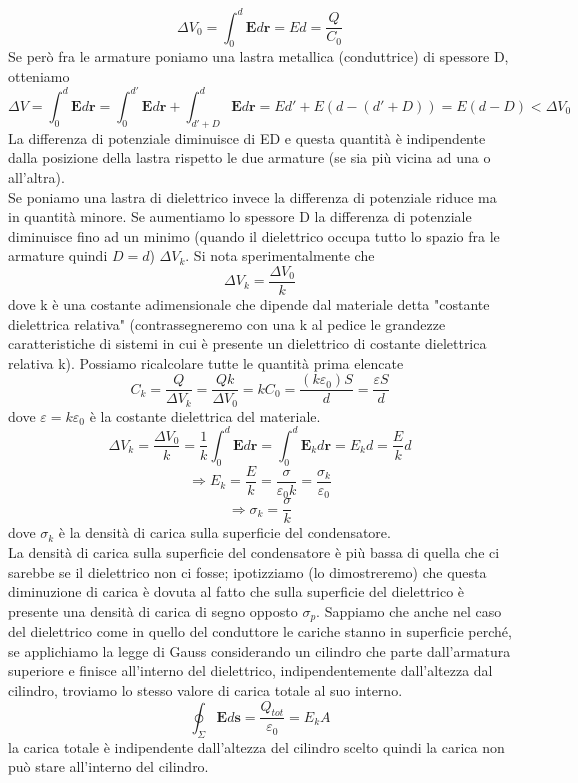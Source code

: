 \documentclass[
10pt, %
a4paper, %
oneside, %
headinclude,footinclude, %
BCOR5mm, %
]{scrartcl}
\begin{document}
\[\Delta V_0 = \int_{0}^{d}\mathbf{E}d\mathbf{r} = Ed = \frac{Q}{C_0}\]
Se però fra le armature poniamo una lastra metallica (conduttrice) di spessore D, otteniamo
\[\Delta V = \int_{0}^{d}\mathbf{E}d\mathbf{r} = \int_{0}^{d'}\mathbf{E}d\mathbf{r} + \int_{d'+D}^{d}\mathbf{E}d\mathbf{r} = Ed' + E(d-(d'+D)) = E(d-D) < \Delta V_0 \]
La differenza di potenziale diminuisce di ED e questa quantità è indipendente dalla posizione della lastra rispetto le due armature (se sia più vicina ad una o all'altra).\\
Se poniamo una lastra di dielettrico invece la differenza di potenziale riduce ma in quantità minore. Se aumentiamo lo spessore D la differenza di potenziale diminuisce fino ad un minimo (quando il dielettrico occupa tutto lo spazio fra le armature quindi \(D = d\)) $\Delta V_k$. Si nota sperimentalmente che 
\[\Delta V_k = \frac{\Delta V_0}{k}\]
dove k è una costante adimensionale che dipende dal materiale detta "costante dielettrica relativa" (contrassegneremo con una k al pedice le grandezze caratteristiche di sistemi in cui è presente un dielettrico di costante dielettrica relativa k). Possiamo ricalcolare tutte le quantità prima elencate
\[C_k = \frac{Q}{\Delta V_k} = \frac{Qk}{\Delta V_0} = kC_0 = \frac{(k\varepsilon_0)S}{d} = \frac{\varepsilon S}{d}\]
dove $\varepsilon = k\varepsilon_0$ è la costante dielettrica del materiale. 
\[\Delta V_k = \frac{\Delta V_0}{k} = \frac{1}{k}\int_{0}^{d}\mathbf{E}d\mathbf{r} = \int_{0}^{d}\mathbf{E}_kd\mathbf{r} = E_kd = \frac{E}{k}d \]
\[\Rightarrow E_k = \frac{E}{k}= \frac{\sigma}{\varepsilon_0 k} = \frac{\sigma_k}{\varepsilon_0}\]
\[\Rightarrow \sigma_k = \frac{\sigma}{k}\]
dove $\sigma_k$ è la densità di carica sulla superficie del condensatore.\\
La densità di carica sulla superficie del condensatore è più bassa di quella che ci sarebbe se il dielettrico non ci fosse; ipotizziamo (lo dimostreremo) che questa diminuzione di carica è dovuta al fatto che sulla superficie del dielettrico è presente una densità di carica di segno opposto \(\sigma_p\). Sappiamo che anche nel caso del dielettrico come in quello del conduttore le cariche stanno in superficie perché, se applichiamo la legge di Gauss considerando un cilindro che parte dall'armatura superiore e finisce all'interno del dielettrico, indipendentemente dall'altezza dal cilindro, troviamo lo stesso valore di carica totale al suo interno.
\[\oint_\Sigma \mathbf{E}d\mathbf{s} = \frac{Q_{tot}}{\varepsilon_0} = E_k A \]
la carica totale è indipendente dall'altezza del cilindro scelto quindi la carica non può stare all'interno del cilindro.\\
\end{document}
